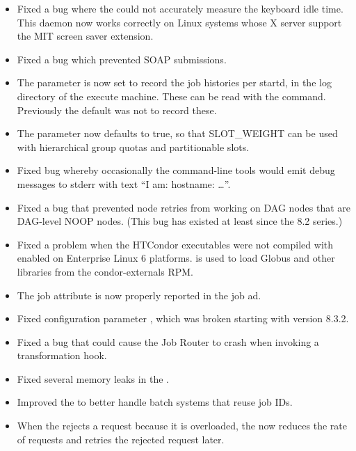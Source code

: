 \begin{itemize}

\item Fixed a bug where the  could not accurately measure
the keyboard idle time.  This daemon now works correctly on Linux systems
whose X server support the MIT screen saver extension.

\item Fixed a bug which prevented SOAP submissions.

\item The parameter  is now set to record
the job histories per startd, in the log directory of the
execute machine. These can be read with the  command.
Previously the default was not to record these.

\item The parameter  now defaults to
true, so that SLOT\_WEIGHT can be used with hierarchical group quotas
and partitionable slots.

\item Fixed bug whereby occasionally the command-line tools would
	emit debug messages to stderr with text ``I am: hostname: \ldots''.

\item Fixed a bug that prevented node retries from working on DAG
nodes that are DAG-level NOOP nodes.  (This bug has existed at least since
the 8.2 series.)

\item Fixed a problem when the HTCondor executables were not compiled
with  enabled on Enterprise Linux 6 platforms.  is used
to load Globus and other libraries from the condor-externals RPM.

\item The job attribute  is now
properly reported in the job ad.

\item Fixed configuration parameter , which was
broken starting with version 8.3.2.

\item Fixed a bug that could cause the Job Router to crash when
invoking a transformation hook.

\item Fixed several memory leaks in the .

\item Improved the  to better handle batch systems
that reuse job IDs.

\item When the  rejects a request because it is
overloaded, the  now reduces the rate of requests
and retries the rejected request later.

\end{itemize}

